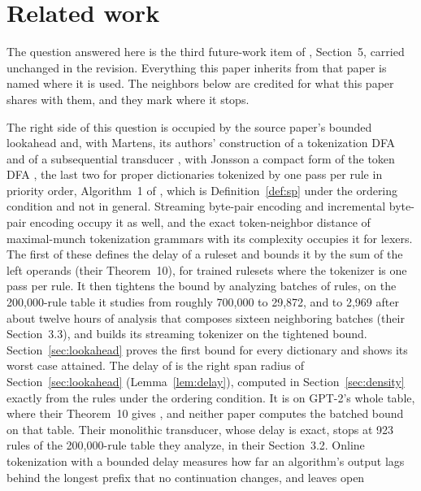 \documentclass[11pt,a4paper]{article}
\theoremstyle{definition}
\theoremstyle{plain}
\begin{document}
\section{Related work}\label{sec:related}

The question answered here is the third future-work item of \citet{berglund2023formalizing}, Section~5, carried
unchanged in the revision. Everything this paper inherits from that paper is named where it is used. The neighbors below
are credited for what this paper shares with them, and they mark where it stops.

The right side of this question is occupied by the source paper's bounded lookahead \citep{berglund2023formalizing} and,
with Martens, its authors' construction of a tokenization DFA and of a subsequential transducer
\citep[Theorem~4]{berglund2024dfa}, with Jonsson a compact form of the token DFA \citep{berglund2025compact}, the last
two for proper dictionaries tokenized by one pass per rule in priority order, Algorithm~1 of \citet{berglund2024dfa},
which is Definition~\ref{def:sp} under the ordering condition and not in general. Streaming byte-pair encoding
\citep{mamouras2026bpe} and incremental byte-pair encoding \citep{jiang2026incremental} occupy it as well, and the exact
token-neighbor distance of maximal-munch tokenization grammars with its complexity \citep{li2026streaming} occupies it
for lexers. The first of these defines the delay of a ruleset and bounds it by the sum of the left operands (their
Theorem~10), for trained rulesets where the tokenizer is one pass per rule. It then tightens the bound by analyzing
batches of rules, on the 200,000-rule table it studies from roughly 700,000 to 29,872, and to 2,969 after about twelve
hours of analysis that composes sixteen neighboring batches (their Section~3.3), and builds its streaming tokenizer on
the tightened bound. Section~\ref{sec:lookahead} proves the first bound for every dictionary and shows its worst case
attained. The delay of \citet{mamouras2026bpe} is the right span radius of Section~\ref{sec:lookahead}
(Lemma~\ref{lem:delay}), computed in Section~\ref{sec:density} exactly from the rules under the ordering condition. It
is \ChainGptQspan{} on GPT-2's whole table, where their Theorem~10 gives \ChainGptQD{}, and neither paper computes the
batched bound on that table. Their monolithic transducer, whose delay is exact, stops at 923 rules of the 200,000-rule
table they analyze, in their Section~3.2. Online tokenization with a bounded delay \citep{dalirrooyfard2026online}
measures how far an algorithm's output lags behind the longest prefix that no continuation changes, and leaves open
\end{document}
